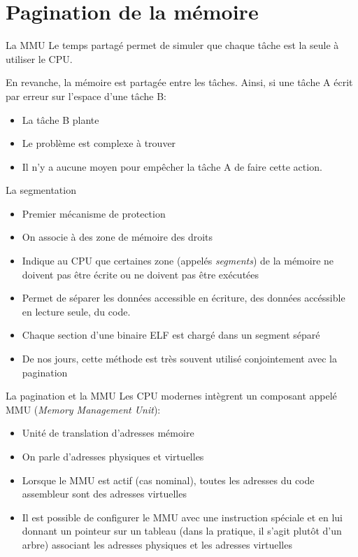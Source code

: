 \section{Pagination de la mémoire}

\begin{frame}{La MMU}
  Le temps partagé  permet de simuler que chaque tâche  est la seule à
  utiliser le CPU.

  En revanche, la mémoire est partagée entre les tâches. Ainsi, si une
  tâche A écrit par erreur sur l'espace d'une tâche B:
  \begin{itemize}
  \item  La tâche B plante
  \item  Le problème est complexe à trouver
  \item Il  n'y a  aucune moyen  pour empêcher la  tâche A  de faire
    cette action.
  \end{itemize}
\end{frame}

\begin{frame}[fragile=singleslide]{La segmentation}
  \begin{itemize}
    \item Premier mécanisme de protection
    \item On associe à des zone de mémoire des droits
    \item Indique au CPU  que certaines zone (appelés \emph{segments})
      de la mémoire ne doivent pas  être écrite ou ne doivent pas être
      exécutées
    \item Permet  de séparer les  données accessible en  écriture, des
      données accéssible en lecture seule, du code.
    \item Chaque section d'une binaire ELF est  chargé dans un
      segment séparé
    \item  De  nos  jours,  cette  méthode est  très  souvent  utilisé
      conjointement avec la pagination
  \end{itemize}
\end{frame}

\begin{frame}{La pagination et la MMU}
  Les CPU  modernes intègrent  un composant appelé  MMU (\emph{Memory
    Management Unit}):
  \begin{itemize}
  \item  Unité de translation d'adresses mémoire
  \item  On parle d'adresses physiques et virtuelles
  \item Lorsque le  MMU est actif (cas nominal),  toutes les adresses
    du code assembleur sont des adresses virtuelles
  \item  Il est  possible de  configurer le  MMU avec  une instruction
    spéciale et  en lui  donnant un pointeur  sur un tableau  (dans la
    pratique,  il s'agit  plutôt d'un  arbre) associant  les adresses
    physiques et les adresses virtuelles
  \end{itemize}
\end{frame}

